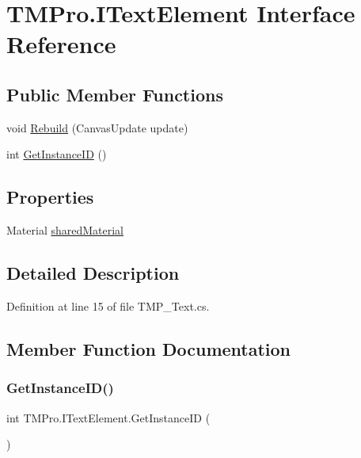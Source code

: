 \hypertarget{interface_t_m_pro_1_1_i_text_element}{}\section{T\+M\+Pro.\+I\+Text\+Element Interface Reference}
\label{interface_t_m_pro_1_1_i_text_element}
\subsection*{Public Member Functions}
\begin{DoxyCompactItemize}
\item 
void \mbox{\hyperlink{interface_t_m_pro_1_1_i_text_element_a08e118a37098ad9a0b5779368344c83d}{Rebuild}} (Canvas\+Update update)
\item 
int \mbox{\hyperlink{interface_t_m_pro_1_1_i_text_element_a8f98729ae447652d96d7c0070c6acff4}{Get\+Instance\+ID}} ()
\end{DoxyCompactItemize}
\subsection*{Properties}
\begin{DoxyCompactItemize}
\item 
Material \mbox{\hyperlink{interface_t_m_pro_1_1_i_text_element_a87a0a40389be0c5fd0a9e4dd485e9665}{shared\+Material}}
\end{DoxyCompactItemize}


\subsection{Detailed Description}


Definition at line 15 of file T\+M\+P\+\_\+\+Text.\+cs.



\subsection{Member Function Documentation}
\mbox{\label{interface_t_m_pro_1_1_i_text_element_a8f98729ae447652d96d7c0070c6acff4}} 
\subsubsection{\texorpdfstring{GetInstanceID()}{GetInstanceID()}}
{\footnotesize\ttfamily int T\+M\+Pro.\+I\+Text\+Element.\+Get\+Instance\+ID (\begin{DoxyParamCaption}{ }\end{DoxyParamCaption})}

